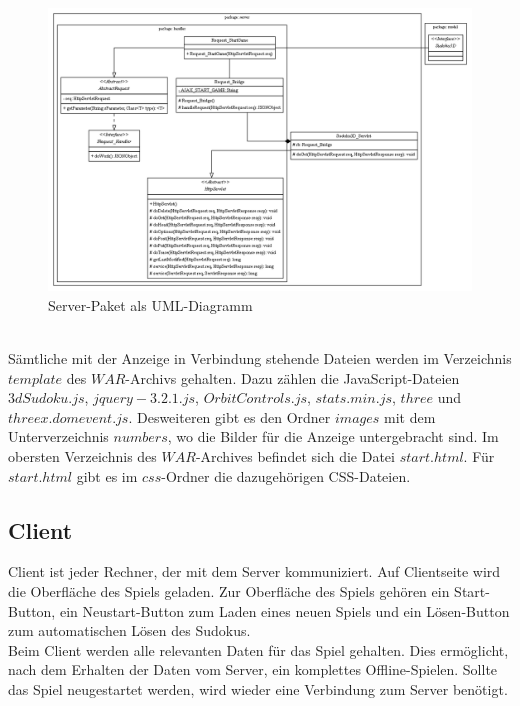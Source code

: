 \documentclass[a4paper,12pt]{scrreprt}
\begin{document}
	\begin{figure}
		\includegraphics[scale=0.55]{pictures/controller}
		\caption{Server-Paket als UML-Diagramm}
	\end{figure}\medskip \\
	S\"amtliche mit der Anzeige in Verbindung stehende Dateien werden im Verzeichnis $template$ des
	$WAR$-Archivs gehalten. Dazu z\"ahlen die JavaScript-Dateien $3dSudoku.js$, $jquery-3.2.1.js$,
	$OrbitControls.js$, $stats.min.js$, $three$ und $threex.domevent.js$. Desweiteren gibt es den Ordner
	$images$ mit dem Unterverzeichnis $numbers$, wo die Bilder f\"ur die Anzeige untergebracht sind.
	Im obersten Verzeichnis des $WAR$-Archives befindet sich die Datei $start.html$.
	F\"ur $start.html$ gibt es im $css$-Ordner die dazugeh\"origen CSS-Dateien.\medskip \\

	\subsection{Client}
	Client ist jeder Rechner, der mit dem Server kommuniziert. Auf Clientseite wird die Oberfl\"ache des
	Spiels geladen. Zur Oberfl\"ache des Spiels geh\"oren ein Start-Button, ein Neustart-Button zum
	Laden eines neuen Spiels und ein L\"osen-Button zum automatischen L\"osen des Sudokus.\medskip \\
	Beim Client werden alle relevanten Daten f\"ur das Spiel gehalten. Dies ermöglicht, nach dem
	Erhalten der Daten vom Server, ein komplettes Offline-Spielen. Sollte das Spiel neugestartet werden,
	wird wieder eine Verbindung zum Server ben\"otigt.
\end{document}
